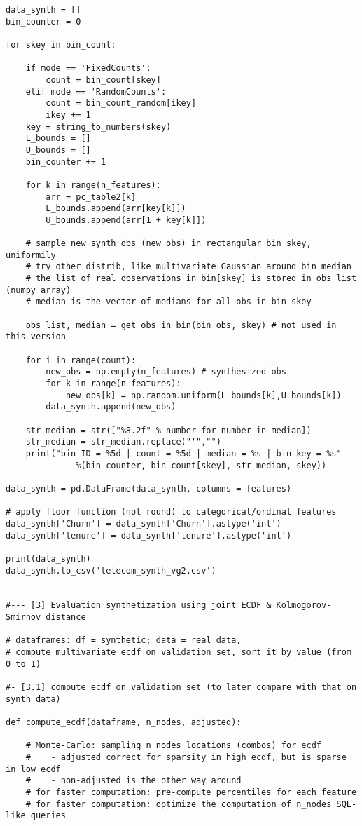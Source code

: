 \documentclass[oneside,10pt]{book}
\begin{document}
\begin{lstlisting}
data_synth = []
bin_counter = 0

for skey in bin_count:

    if mode == 'FixedCounts':
        count = bin_count[skey]
    elif mode == 'RandomCounts':
        count = bin_count_random[ikey]
        ikey += 1
    key = string_to_numbers(skey)
    L_bounds = []
    U_bounds = []
    bin_counter += 1

    for k in range(n_features):
        arr = pc_table2[k]
        L_bounds.append(arr[key[k]])
        U_bounds.append(arr[1 + key[k]])

    # sample new synth obs (new_obs) in rectangular bin skey, uniformily
    # try other distrib, like multivariate Gaussian around bin median
    # the list of real observations in bin[skey] is stored in obs_list (numpy array)
    # median is the vector of medians for all obs in bin skey

    obs_list, median = get_obs_in_bin(bin_obs, skey) # not used in this version

    for i in range(count):
        new_obs = np.empty(n_features) # synthesized obs
        for k in range(n_features):
            new_obs[k] = np.random.uniform(L_bounds[k],U_bounds[k])
        data_synth.append(new_obs)

    str_median = str(["%8.2f" % number for number in median])
    str_median = str_median.replace("'","")
    print("bin ID = %5d | count = %5d | median = %s | bin key = %s"
              %(bin_counter, bin_count[skey], str_median, skey))

data_synth = pd.DataFrame(data_synth, columns = features)

# apply floor function (not round) to categorical/ordinal features
data_synth['Churn'] = data_synth['Churn'].astype('int')
data_synth['tenure'] = data_synth['tenure'].astype('int')

print(data_synth)
data_synth.to_csv('telecom_synth_vg2.csv')


#--- [3] Evaluation synthetization using joint ECDF & Kolmogorov-Smirnov distance

# dataframes: df = synthetic; data = real data,
# compute multivariate ecdf on validation set, sort it by value (from 0 to 1)

#- [3.1] compute ecdf on validation set (to later compare with that on synth data)

def compute_ecdf(dataframe, n_nodes, adjusted):

    # Monte-Carlo: sampling n_nodes locations (combos) for ecdf
    #    - adjusted correct for sparsity in high ecdf, but is sparse in low ecdf
    #    - non-adjusted is the other way around
    # for faster computation: pre-compute percentiles for each feature
    # for faster computation: optimize the computation of n_nodes SQL-like queries


\end{lstlisting}
\end{document}
